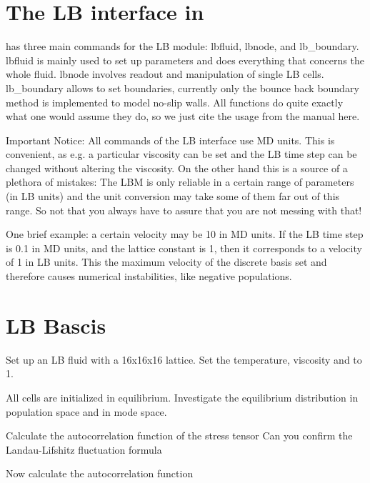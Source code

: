 

\section{The LB interface in \ES{}}
\ES{} has three main commands for the LB module: 
lbfluid, lbnode, and lb_boundary.
lbfluid is mainly used to set up parameters and does everything that
concerns the whole fluid. lbnode involves readout and manipulation of
single LB cells. lb_boundary allows to set boundaries, currently only
the bounce back boundary method is implemented to model
no-slip walls. All functions do quite exactly what one would 
assume they do, so we just cite the usage from the \ES{} manual here.

Important Notice: All commands of the LB interface use
MD units. This is convenient, as e.g. a particular 
viscosity can be set and the LB time step can be changed without
altering the viscosity. On the other hand this is a source
of a plethora of mistakes: The LBM is only reliable in a certain 
range of parameters (in LB units) and the unit conversion
may take some of them far out of this range. So not that you always
have to assure that you are not messing with that!

One brief example: a certain velocity may be 10 in MD units.
If the LB time step is 0.1 in MD units, and the lattice constant
is 1, then it corresponds to a velocity of 1 in LB units. 
This the maximum velocity of the discrete basis set and therefore
causes numerical instabilities, like negative populations.

\section{LB Bascis}
Set up an LB fluid with a 16x16x16 lattice. 
Set the temperature, viscosity and to 1.

All cells are initialized in equilibrium. Investigate the
equilibrium distribution in population space and in mode space.

Calculate the autocorrelation function of the stress tensor
Can you confirm the Landau-Lifshitz fluctuation formula

Now calculate the autocorrelation function 
